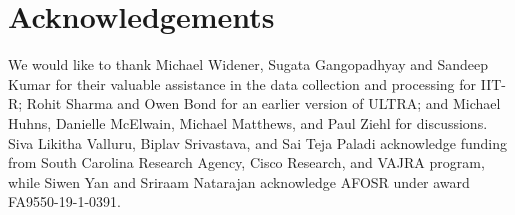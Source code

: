 \section*{Acknowledgements}
We would like to thank Michael Widener,  Sugata Gangopadhyay and Sandeep Kumar for their valuable assistance in the data collection and processing for IIT-R; Rohit Sharma and Owen Bond for an earlier version of ULTRA; and Michael Huhns, Danielle McElwain, Michael Matthews, and  Paul Ziehl for discussions. Siva Likitha Valluru, Biplav Srivastava, and Sai Teja Paladi acknowledge funding from South Carolina Research Agency, Cisco Research, and VAJRA program, while Siwen Yan and Sriraam Natarajan acknowledge AFOSR under award FA9550-19-1-0391.